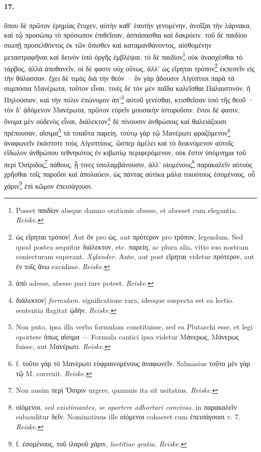 \documentclass[a4paper, 11pt, oneside, polutonikogreek, german, landscape]{article}
\begin{document}
\paragraph{17.}
ὅπου δὲ πρῶτον ἐρημίας ἔτυχεν, αὐτὴν καθ' ἑαυτὴν γενομένην, ἀνοῖξαι τὴν λάρνακα, καὶ τῷ προσώπῳ τὸ πρόσωπον ἐπιθεῖσαν, ἀσπάσασθαι καὶ δακρύειν. τοῦ δὲ παιδίου σιωπῇ προσελθόντος ἐκ τῶν ὄπισθεν καὶ καταμανθάνοντος, αἰσθομένην μεταστραφῆναι καὶ δεινὸν ὑπὸ ὀργῆς ἐμβλέψαι. τὸ δὲ παιδίον\footnote{Posset παιδίον absque damno orationis abesse, et abesset cum elegantia. \emph{Reiske.}} οὐκ ἀνασχέσθαι τὸ τάρβος, ἀλλὰ ἀποθανεῖν. οἱ δέ φασιν οὐχ οὕτως, ἀλλ' ὡς εἴρηται τρόπον\footnote{ὡς εἴρηται τρόπον] Aut ὃν pro ὡς, aut πρότερον pro τρόπον, legendum. Sed quod postea sequitur διάλεκτον, etc. παρείη, ac plura alia, vitio suo nostram coniecturam superant. \emph{Xylander.} Ante, aut post εἴρηται videtur πρότερον, aut ἐν τοῖς ἂνω excidisse. \emph{Reiske.}} ἐκπεσεῖν εἰς τὴν θάλασσαν. ἔχει δὲ τιμὰς διὰ τὴν θεόν · ὃν γὰρ ᾄδουσιν Αἰγύπτιοι παρὰ τὰ συμπόσια Μανέρωτα, τοῦτον εἶναι. τινὲς δὲ τὸν μὲν παῖδα καλεῖσθαι Παλαιστινὸν, ἢ Πηλούσιον, καὶ τὴν πόλιν ἐπώνυμον ἀπ'\footnote{ἀπὸ adesse, abesse pari iure potest. \emph{Reiske.}} αὐτοῦ γενέσθαι, κτισθεῖσαν ὑπὸ τῆς θεοῦ · τὸν δ' ᾀδόμενον Μανέρωτα, πρῶτον εὑρεῖν μουσικὴν ἱστοροῦσιν. ἔνιοι δέ φασιν, ὄνομα μὲν οὐδενὸς εἶναι, διάλεκτον\footnote{διάλεκτον] \emph{formulam.} significatione rara, ideoque suspecta est ea lectio. sententia flagitat ᾠδὴν. \emph{Reiske.}} δὲ πίνουσιν ἀνθρώποις καὶ θαλειάζουσι πρέπουσαν, αἴσιμα\footnote{Non puto, ipsa illa verba formulam constituisse, sed ea Plutarchi esse, et legi oportere ὅπως αἴσιμα --- Formula cantici ipsa videtur Μάνερως, Μάνερως fuisse, aut Μανέρωτι. \emph{Reiske.}} τὰ τοιαῦτα παρείη. τούτῳ γὰρ τῷ Μανέρωτι φραζόμενον\footnote{f. τοῦτο γὰρ τὸ Μανέρωτι εὐφραινομένους ἀναφωνεῖν. Salmasius τοῦτο μὲν γὰρ τῷ Μ. correxit. \emph{Reiske.}} ἀναφωνεῖν ἑκάστοτε τοὺς Αἰγυπτίους, ὥσπερ ἀμέλει καὶ τὸ δεικνύμενον αὐτοῖς εἴδωλον ἀνθρώπου τεθνηκότος ἐν κιβωτίῳ περιφερόμενον, οὐκ ἔστιν ὑπόμνημα τοῦ περὶ Ὀσίριδος\footnote{Non ausim περὶ Ὄσιριν urgere, quamuis ita sit usitatius. \emph{Reiske.}} πάθους, ᾗ τινες ὑπολαμβάνουσιν, ἀλλ' οἰομένους\footnote{οἰόμενοι. \emph{sed existimantes, se oportere adhortari convivas.} in παρακαλεῖν subauditur δεῖν. Nominatiuus ille οἰόμενοι cohaeret cum ἐπεισάγουσι v. 7. \emph{Reiske.}} παρακαλεῖν αὑτοὺς χρῆσθαι τοῖς παροῦσι καὶ ἀπολαύειν, ὡς πάντας αὐτίκα μάλα τοιούτους ἐσομένους, οὗ χάριν\footnote{f. ἐσομένους, τοῦ ἱλαροῦ χάριν, \emph{laetitiae gratia.} \emph{Reiske.}} ἐπὶ κῶμον ἐπεισάγουσι.
\end{document}
